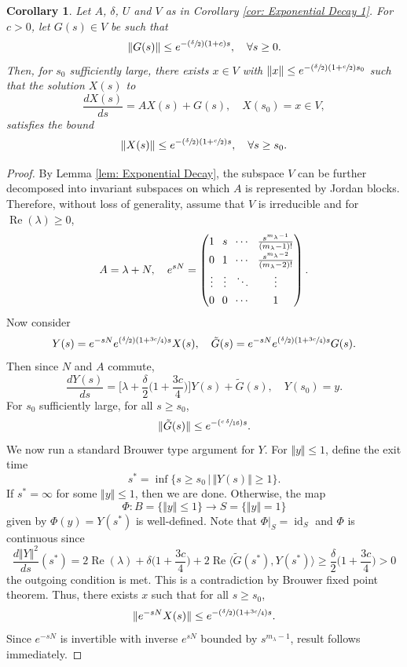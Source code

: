 \documentclass[10pt]{amsart}
\newcommand{\Psfrac}[2]{(\sfrac{#1}{#2})}
\theoremstyle{plain}
\newtheorem{corollary}[proposition]{Corollary}
\theoremstyle{definition}
\DeclareMathOperator{\id}{id}
\def\Re{\operatorname{Re}}
\begin{document}
\begin{corollary}
\label{cor: Exponential Decay 2}
Let $A$, $\delta$, $U$ and $V$ as in \emph{Corollary \ref{cor: Exponential Decay 1}}. For $c>0$, let $G(s)\in V$ be such that
\[
\Vert G(s)\Vert\le e^{-\Psfrac{\delta}{2}(1+c)s},\quad \forall s\ge 0.
\]
Then, for $s_0$ sufficiently large, there exists $x\in V$ with $\Vert x\Vert\le e^{-\Psfrac{\delta}{2}(1+\sfrac{c}{2})s_0}$ such that the solution $X(s)$ to
\[
\frac{dX(s)}{ds}=AX(s)+G(s),\quad X(s_0)=x\in V,
\]
satisfies the bound
\[
\Vert X(s)\Vert \le e^{-\Psfrac{\delta}{2}(1+\sfrac{c}{2})s},\quad \forall s\ge s_0.
\]
\end{corollary}
\begin{proof}
By Lemma \ref{lem: Exponential Decay}, the subspace $V$ can be further decomposed into invariant subspaces on which $A$ is represented by Jordan blocks. Therefore, without loss of generality, assume that $V$ is irreducible and for $\Re(\lambda)\ge0$,
\begin{equation}
\label{eq: Jordan Block}
\arraycolsep3.5pt
A=\lambda+N,\quad e^{sN}=
\begin{pmatrix}
1 & s& \cdots & \tfrac{s^{m_\lambda-1}}{(m_\lambda -1)!}\\[3pt]
0 & 1 & \cdots & \tfrac{s^{m_\lambda-2}}{(m_\lambda -2)!}\\[3pt]
\vdots & \vdots &\ddots& \vdots\\[3pt]
0 & 0 & \cdots & 1
\end{pmatrix}.
\end{equation}
Now consider
\[
Y(s)= e^{-sN}e^{\Psfrac{\delta}{2}(1+\sfrac{3c}{4})s}X(s),\quad \tilde G(s)=e^{-sN}e^{\Psfrac{\delta}{2}(1+\sfrac{3c}{4})s}G(s).
\]
Then since $N$ and $A$ commute,
\[
\frac{dY(s)}{ds}=\Big[\lambda+\frac{\delta}{2}\Big(1+\frac{3c}{4}\Big)\Big]Y(s)+\tilde G(s),\quad Y(s_0)=y.
\]
For $s_0$ sufficiently large, for all $s\ge s_0$,
\[
\Vert\tilde G(s)\Vert \le e^{-\Psfrac{c\,\delta}{16}s}.
\]
We now run a standard Brouwer type argument for $Y$. For $\Vert y \Vert \le 1$, define the exit time
\[
s^*=\inf\{s\ge s_0\,|\, \Vert Y(s)\Vert\ge1\}.
\]
If $s^*=\infty$ for some $\Vert y\Vert \le 1$, then we are done. Otherwise, the map
\[
\Phi:B=\{\Vert y\Vert \le1\}\to S=\{\Vert y\Vert =1\}
\]
given by $\Phi(y)=Y(s^*)$ is well-defined. Note that $\Phi|_{S}=\id_S$ and $\Phi$ is continuous since
\[
\frac{d\Vert Y\Vert^2}{ds}(s^*)=2\Re(\lambda)+\delta\Big(1+\frac{3c}{4}\Big)+2\Re\langle \tilde G(s^*),Y(s^*)\rangle\ge \frac{\delta}{2}\Big(1+\frac{3c}{4}\Big)>0
\]
\ie the outgoing condition is met. This is a contradiction by Brouwer fixed point theorem. Thus, there exists $x$ such that for all $s\ge s_0$,
\[
\Vert e^{-sN}X(s)\Vert \le e^{-\Psfrac{\delta}{2}(1+\sfrac{3c}{4})s}.
\]
Since $e^{-sN}$ is invertible with inverse $e^{sN}$ bounded by $s^{m_\lambda-1}$, result follows immediately.
\end{proof}
\end{document}
